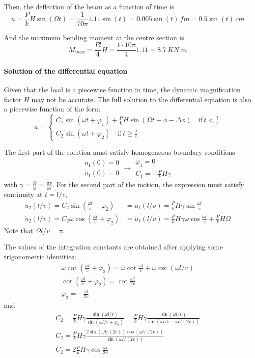 \begin{Answer}[ref={moving_load}]
Then, the deflection of the beam as a function of time is
$$
u = \frac{P}{k}H\sin(\Omega t) = \frac{1}{70\pi}1.11\sin(t) = 0.005\sin(t)\,f\si{m} = 0.5\sin(t)\,\si{cm}
$$

And the maximum bending moment at the centre section is
$$
M_{max} = \frac{Pl}{4}H = \frac{1 \cdot 10\pi}{4}1.11 = \SI{8.7}{KN.m}
$$

\paragraph{Solution of the differential equation}
Given that the load is a piecewise function in time, the dynamic magnification factor $H$ may not be accurate. The full solution to the differential equation is also a piecewise function of the form
$$
u =
\begin{cases}
C_1\sin(\omega t + \varphi_1) + \frac{P}{k}H\sin(\Omega t + \phi - \Delta\phi) \quad \text{if}\ t < \frac{l}{v} \\
C_2\sin(\omega t + \varphi_2) \quad \text{if}\ t \geq \frac{l}{v}
\end{cases}
$$

The first part of the solution must satisfy homogeneous boundary conditions
$$
\begin{array}{l}
u_1(0) = 0 \\
\dot{u}_1(0) = 0
\end{array} \rightarrow
\begin{array}{l}
\varphi_1 = 0 \\
C_1 = -\frac{P}{k}H\gamma
\end{array}
$$
with $\gamma = \frac{\Omega}{\omega} = \frac{\pi v}{\omega l}$. For the second part of the motion, the expression must satisfy continuity at $t = l/v$,
\begin{align*}
u_2(l/v) = C_2\sin\left(\frac{\omega l}{v}+\varphi_2\right) &= u_1(l/v) = \frac{P}{k}H\gamma\sin\frac{\omega l}{v} \\
\dot{u}_2(l/v) = C_2\omega\cos\left(\frac{\omega l}{v}+\varphi_2\right) &= \dot{u}_1(l/v) = \frac{P}{k}H\gamma\omega\cos\frac{\omega l}{v} + \frac{P}{k}H\Omega
\end{align*}
Note that $\Omega l/v = \pi$.

The values of the integration constants are obtained after applying some trigonometric identities:
\begin{gather*}
\omega\cot\left(\frac{\omega l}{v}+\varphi_2\right) = \omega\cot\frac{\omega l}{v} + \omega\csc(\omega l/v) \\
\cot\left(\frac{\omega l}{v}+\varphi_2\right) = \cot\frac{\omega l}{2v} \\
\varphi_2 = -\frac{\omega l}{2v}
\end{gather*}
and
\begin{gather*}
C_2 = \frac{P}{k}H\gamma\frac{\sin(\omega l/v)}{\sin(\omega l/v + \varphi_2)} =
    \frac{P}{k}H\gamma\frac{\sin(\omega l/v)}{\sin(\omega l/v - \omega l/(2v))} \\[4pt]
C_2 = \frac{P}{k}H\gamma\frac{2\sin(\omega l/(2v))\cos(\omega l/(2v))}{\sin(\omega l/(2v))} \\[2pt]
C_2 = 2\frac{P}{k}H\gamma\cos\frac{\omega l}{2v}
\end{gather*}


\end{Answer}
